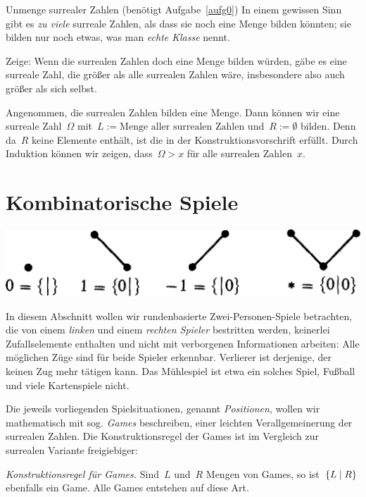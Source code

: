 \documentclass{zirkelblatt}
\newcommand{\head}[1]{\section*{\rmfamily #1}}%
\begin{document}
\begin{aufgabe}{Unmenge surrealer Zahlen (benötigt Aufgabe~\ref{aufg0})}
\label{unmenge}
In einem gewissen Sinn gibt es \emph{zu viele} surreale Zahlen, als dass sie
noch eine Menge bilden könnten; sie bilden nur noch etwas, was man \emph{echte
Klasse} nennt.

Zeige: Wenn die surrealen Zahlen doch eine Menge bilden würden, gäbe es eine
surreale Zahl, die größer als alle surrealen Zahlen wäre, insbesondere also auch
größer als sich selbst.
\end{aufgabe}
\begin{loesung}
Angenommen, die surrealen Zahlen bilden eine Menge. Dann können wir eine surreale
Zahl~$\Omega$ mit~$L := \text{Menge aller surrealen Zahlen}$ und~$R :=
\emptyset$ bilden. Denn da~$R$ keine Elemente enthält, ist die
 in der Konstruktionsvorschrift erfüllt. Durch Induktion
können wir zeigen, dass~$\Omega > x$ für alle surrealen Zahlen~$x$.
\end{loesung}


\newpage
\head{Kombinatorische Spiele}

\begin{center}\includegraphics[scale=0.2]{einfache-spiele}\end{center}

In diesem Abschnitt wollen wir rundenbasierte Zwei-Personen-Spiele betrachten,
die von einem \emph{linken} und einem \emph{rechten Spieler} bestritten werden,
keinerlei Zufallselemente enthalten und nicht mit verborgenen Informationen
arbeiten: Alle möglichen Züge sind für beide Spieler erkennbar. Verlierer ist
derjenige, der keinen Zug mehr tätigen kann. Das Mühlespiel ist etwa ein
solches Spiel, Fußball und viele Kartenspiele nicht.

Die jeweils vorliegenden Spielsituationen, genannt \emph{Positionen}, wollen wir
mathematisch mit sog. \emph{Games} beschreiben, einer leichten
Verallgemeinerung der surrealen Zahlen. Die Konstruktionsregel der Games ist
im Vergleich zur surrealen Variante freigiebiger:

\emph{Konstruktionsregel für Games.}
Sind~$L$ und~$R$ Mengen von Games,
so ist~$\{ L \mathrel{|} R \}$ ebenfalls ein Game. Alle Games entstehen auf diese Art.
\end{document}
